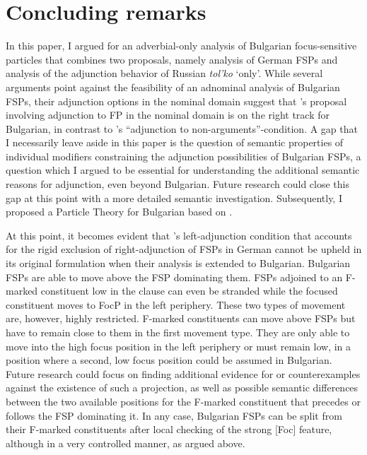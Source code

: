 \documentclass[output=paper,colorlinks,citecolor=brown]{langscibook}
\begin{document}
\section{Concluding remarks}\label{sec:5}
In this paper, I argued for an adverbial-only analysis of Bulgarian focus-sensitive particles that combines two proposals, namely  analysis of German FSPs and  analysis of the adjunction behavior of Russian \textit{tol'ko} `only'. While several arguments point against the feasibility of an adnominal analysis of Bulgarian FSPs, their adjunction options in the nominal domain suggest that \citeauthor{Zanon2018}'s proposal involving adjunction to FP in the nominal domain is on the right track for Bulgarian, in contrast to \citeauthor{BuringHartmann2001}'s ``adjunction to non-arguments''-condition. A gap that I necessarily leave aside in this paper is the question of semantic properties of individual modifiers constraining the adjunction possibilities of Bulgarian FSPs, a question which I argued to be essential for understanding the additional semantic reasons for adjunction, even beyond Bulgarian. Future research could close this gap at this point with a more detailed semantic investigation. Subsequently, I proposed a Particle Theory for Bulgarian based on \citet{BuringHartmann2001}. \par 
At this point, it becomes evident that \citeauthor{BuringHartmann2001}'s left-adjunction condition that accounts for the rigid exclusion of right-adjunction of FSPs in German cannot be upheld in its original formulation when their analysis is extended to Bulgarian. Bulgarian FSPs are able to move above the FSP dominating them. FSPs adjoined to an F-marked constituent low in the clause can even be stranded while the focused constituent moves to FocP in the left periphery. These two types of movement are, however, highly restricted. F-marked constituents can move above FSPs but have to remain close to them in the first movement type. They are only able to move into the high focus position in the left periphery or must remain low, in a position where a second, low focus position could be assumed in Bulgarian. Future research could focus on finding additional evidence for or counterexamples against the existence of such a projection, as well as possible semantic differences between the two available positions for the F-marked constituent that precedes or follows the FSP dominating it. In any case, Bulgarian FSPs can be split from their F-marked constituents after local checking of the strong [Foc] feature, although in a very controlled manner, as argued above. \par 
\end{document}
